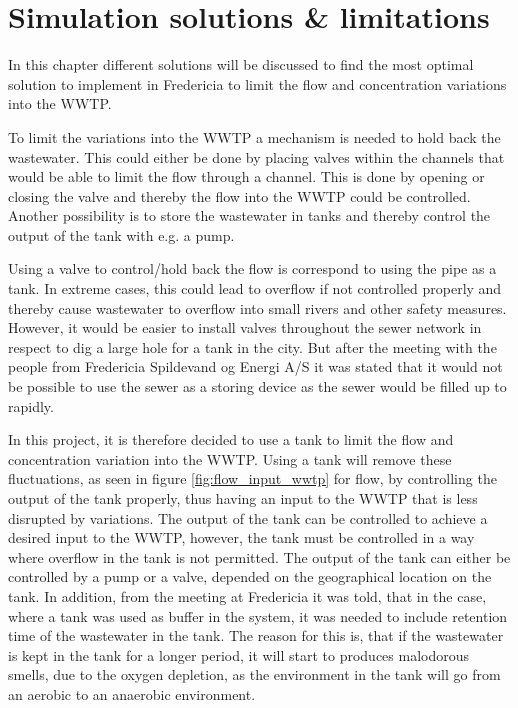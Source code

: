 
\chapter{Simulation solutions \& limitations }\label{ch:simulation_solution_and_limitation}
In this chapter different solutions will be discussed to find the most optimal solution to implement in Fredericia to limit the flow and concentration variations into the WWTP.

To limit the variations into the WWTP a mechanism is needed to hold back the wastewater. This could either be done by placing valves within the channels that would be able to limit the flow through a channel. This is done by opening or closing the valve and thereby the flow into the WWTP could be controlled. Another possibility is to store the wastewater in tanks and thereby control the output of the tank with e.g. a pump. 

Using a valve to control/hold back the flow is correspond to using the pipe as a tank. In extreme cases, this could lead to overflow if not controlled properly and thereby cause wastewater to overflow into small rivers and other safety measures. However, it would be easier to install valves throughout the sewer network in respect to dig a large hole for a tank in the city. But after the meeting with the people from Fredericia Spildevand og Energi A/S it was stated that it would not be possible to use the sewer as a storing device as the sewer would be filled up to rapidly.     

In this project, it is therefore decided to use a tank to limit the flow and concentration variation into the WWTP. Using a tank will remove these fluctuations, as seen in figure \ref{fig:flow_input_wwtp} for flow, by controlling the output of the tank properly, thus having an input to the WWTP that is less disrupted by variations. The output of the tank can be controlled to achieve a desired input to the WWTP, however, the tank must be controlled in a way where overflow in the tank is not permitted. The output of the tank can either be controlled by a pump or a valve, depended on the geographical location on the tank. In addition, from the meeting at Fredericia it was told, that in the case, where a tank was used as buffer in the system, it was needed to include retention time of the wastewater in the tank. The reason for this is, that if the wastewater is kept in the tank for a longer period, it will start to produces malodorous smells, due to the oxygen depletion, as the environment in the tank will go from an aerobic to an anaerobic environment. 

